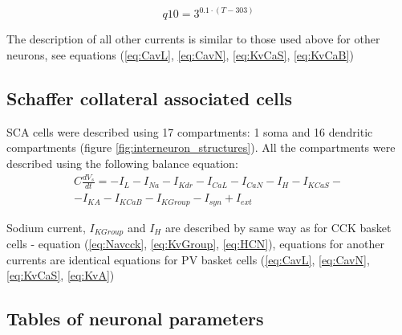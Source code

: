 \documentclass[a4paper,12pt]{article}
\begin{document}
\begin{equation}
q10 = 3^{0.1\cdot (T - 303) } 
\end{equation}

The description of all other currents is similar to those used above for other neurons, see equations (\ref{eq:CavL}, \ref{eq:CavN}, \ref{eq:KvCaS}, \ref{eq:KvCaB})

\subsection{Schaffer collateral associated cells}
SCA cells were described using 17 compartments: 1 soma and 16 dendritic compartments (figure \ref{fig:interneuron_structures}). All the compartments were described using the following balance equation:
\begin{eqnarray}
C\frac{dV_s}{dt}=-I_L-I_{Na}-I_{Kdr}-I_{CaL}-I_{CaN}-I_{H}-I_{KCaS}- \nonumber \\ -I_{KA}-I_{KCaB}-I_{KGroup}-I_{syn} + I_{ext}
\end{eqnarray}

Sodium current, $I_{KGroup}$ and $I_{H}$ are described by same way as for CCK basket cells - equation  (\ref{eq:Navcck}, \ref{eq:KvGroup}, \ref{eq:HCN}), equations for another currents are identical equations for PV basket cells  (\ref{eq:CavL}, \ref{eq:CavN}, \ref{eq:KvCaS}, \ref{eq:KvA})

\subsection{Tables of neuronal parameters} \label{tables_of_neurons}












\end{document}
